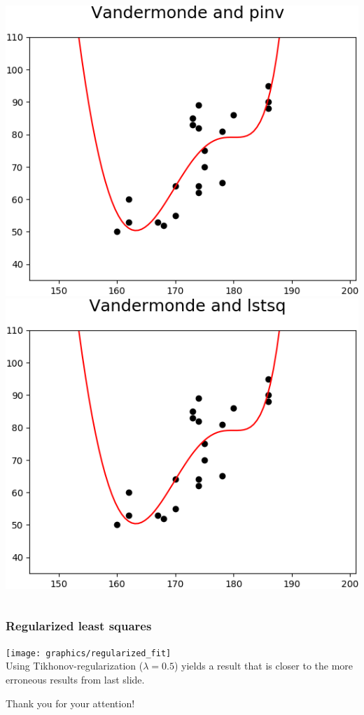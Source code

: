 \documentclass{beamer}
\begin{document}
\begin{frame}
\begin{columns}[t]
		\centering
		\includegraphics[width=0.9\linewidth]{graphics/polyvander_pinv_mark}\\
		\vspace{0.2cm}
		\includegraphics[width=0.9\linewidth]{graphics/polyvander_lstsq_mark}
	\end{columns}
\end{frame}

\begin{frame}
	\frametitle{Regularized least squares}
	\centering\texttt{[image: graphics/regularized\_fit]} \\
	Using Tikhonov-regularization ($\lambda=0.5$) yields a result that is closer to the more erroneous results from last slide.
\end{frame}

\begin{frame}
\centering
{\huge Thank you for your attention!}
\end{frame}

%
%

\end{document}
